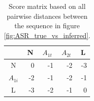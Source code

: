 \begin{table}[ht!]
\centering
\begin{tabular}{c|r|r|r|r}
\rowcolor[HTML]{EFEFEF} 
                                 & \multicolumn{1}{c|}{\cellcolor[HTML]{EFEFEF}N} & \multicolumn{1}{c|}{\cellcolor[HTML]{EFEFEF}$A_{1t}$} & \multicolumn{1}{c|}{\cellcolor[HTML]{EFEFEF}$A_{2t}$} & \multicolumn{1}{c}{\cellcolor[HTML]{EFEFEF}L} \\ \hline
\cellcolor[HTML]{EFEFEF}N        & 0                                              & -1                                                    & -2                                                    & \multicolumn{1}{r|}{-3}                       \\ \hline
\cellcolor[HTML]{EFEFEF}$A_{1i}$ & -2                                             & -1                                                     & -2                                                    & \multicolumn{1}{r|}{-1}                       \\ \hline
\cellcolor[HTML]{EFEFEF}L        & -3                                             & -2                                                    & -1                                                    & \multicolumn{1}{r|}{0}                        \\ \hline
\end{tabular}
    \caption{
         \label{distance_matrix}
             Score matrix based on all pairwise distances between the sequence in figure \ref{fig:ASR_true_vs_inferred}.
             }
\end{table}


